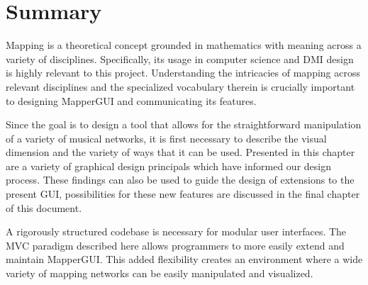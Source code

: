 
\section{Summary} %
\label{sec:background_summary}

Mapping is a theoretical concept grounded in mathematics with meaning across a variety of disciplines. Specifically, its usage in computer science and DMI design is highly relevant to this project. Understanding the intricacies of mapping across relevant disciplines and the specialized vocabulary therein is crucially important to designing MapperGUI and communicating its features.

Since the goal is to design a tool that allows for the straightforward manipulation of a variety of musical networks, it is first necessary to describe the visual dimension and the variety of ways that it can be used. Presented in this chapter are a variety of graphical design principals which have informed our design process. These findings can also be used to guide the design of extensions to the present GUI, possibilities for these new features are discussed in the final chapter of this document. 

A rigorously structured codebase is necessary for modular user interfaces. The MVC paradigm described here allows programmers to more easily extend and maintain MapperGUI. This added flexibility creates an environment where a wide variety of mapping networks can be easily manipulated and visualized.


	